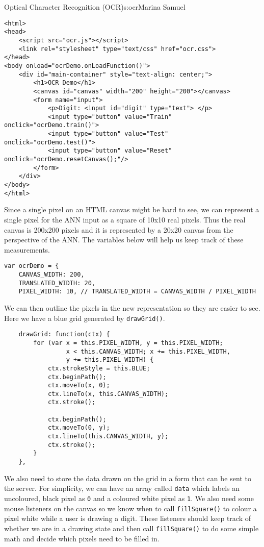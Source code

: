 \begin{aosachapter}{Optical Character Recognition (OCR)}{s:ocr}{Marina Samuel}
\begin{verbatim}
<html>
<head>
    <script src="ocr.js"></script>
    <link rel="stylesheet" type="text/css" href="ocr.css">
</head>
<body onload="ocrDemo.onLoadFunction()">
    <div id="main-container" style="text-align: center;">
        <h1>OCR Demo</h1>
        <canvas id="canvas" width="200" height="200"></canvas>
        <form name="input">
            <p>Digit: <input id="digit" type="text"> </p>
            <input type="button" value="Train" onclick="ocrDemo.train()">
            <input type="button" value="Test" onclick="ocrDemo.test()">
            <input type="button" value="Reset" onclick="ocrDemo.resetCanvas();"/>
        </form> 
    </div>
</body>
</html>
\end{verbatim}

\label{an-ocr-client-ocr.js}

Since a single pixel on an HTML canvas might be hard to see, we can
represent a single pixel for the ANN input as a square of 10x10 real
pixels. Thus the real canvas is 200x200 pixels and it is represented by
a 20x20 canvas from the perspective of the ANN. The variables below will
help us keep track of these measurements.

\begin{verbatim}
var ocrDemo = {
    CANVAS_WIDTH: 200,
    TRANSLATED_WIDTH: 20,
    PIXEL_WIDTH: 10, // TRANSLATED_WIDTH = CANVAS_WIDTH / PIXEL_WIDTH
\end{verbatim}

We can then outline the pixels in the new representation so they are
easier to see. Here we have a blue grid generated by
\texttt{drawGrid()}.

\begin{verbatim}
    drawGrid: function(ctx) {
        for (var x = this.PIXEL_WIDTH, y = this.PIXEL_WIDTH; 
                 x < this.CANVAS_WIDTH; x += this.PIXEL_WIDTH, 
                 y += this.PIXEL_WIDTH) {
            ctx.strokeStyle = this.BLUE;
            ctx.beginPath();
            ctx.moveTo(x, 0);
            ctx.lineTo(x, this.CANVAS_WIDTH);
            ctx.stroke();

            ctx.beginPath();
            ctx.moveTo(0, y);
            ctx.lineTo(this.CANVAS_WIDTH, y);
            ctx.stroke();
        }
    },
\end{verbatim}

We also need to store the data drawn on the grid in a form that can be
sent to the server. For simplicity, we can have an array called
\texttt{data} which labels an uncoloured, black pixel as \texttt{0} and
a coloured white pixel as \texttt{1}. We also need some mouse listeners
on the canvas so we know when to call \texttt{fillSquare()} to colour a
pixel white while a user is drawing a digit. These listeners should keep
track of whether we are in a drawing state and then call
\texttt{fillSquare()} to do some simple math and decide which pixels
need to be filled in.


\end{aosachapter}
